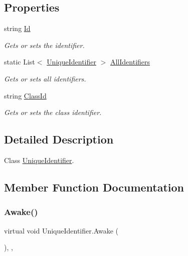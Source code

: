 \subsection*{Properties}
\begin{DoxyCompactItemize}
\item 
string \hyperlink{class_unique_identifier_a5ba479bcdc803e239625d2b699695451}{Id}
\begin{DoxyCompactList}\small\item\em Gets or sets the identifier. \end{DoxyCompactList}\item 
static List$<$ \hyperlink{class_unique_identifier}{Unique\+Identifier} $>$ \hyperlink{class_unique_identifier_a440112bdfcc657532dfdfafc6f6d9387}{All\+Identifiers}
\begin{DoxyCompactList}\small\item\em Gets or sets all identifiers. \end{DoxyCompactList}\item 
string \hyperlink{class_unique_identifier_aa02e26cc7965fbe902f0309a2a69ad9d}{Class\+Id}
\begin{DoxyCompactList}\small\item\em Gets or sets the class identifier. \end{DoxyCompactList}\end{DoxyCompactItemize}


\subsection{Detailed Description}
Class \hyperlink{class_unique_identifier}{Unique\+Identifier}. 



\subsection{Member Function Documentation}
\mbox{\label{class_unique_identifier_adc29ef30266f6ac51f9489ce21d0f816}} 
\subsubsection{\texorpdfstring{Awake()}{Awake()}}
{\footnotesize\ttfamily virtual void Unique\+Identifier.\+Awake (\begin{DoxyParamCaption}{ }\end{DoxyParamCaption})\hspace{0.3cm}{\ttfamily [inline]}, {\ttfamily [protected]}, {\ttfamily [virtual]}}



